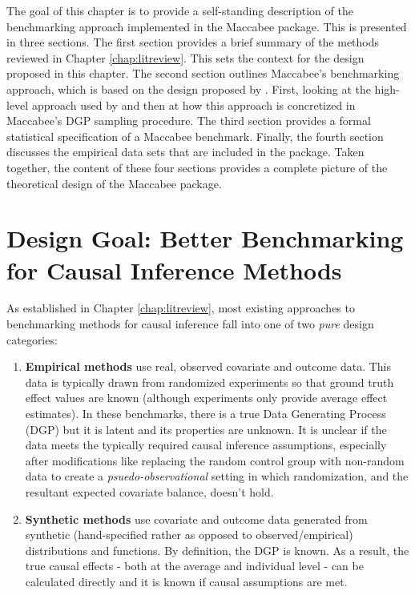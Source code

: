 \documentclass[../main.tex]{subfiles}
\begin{document}
The goal of this chapter is to provide a self-standing description of the benchmarking approach implemented in the Maccabee package. This is presented in three sections. The first section provides a brief summary of the methods reviewed in Chapter \ref{chap:litreview}. This sets the context for the design proposed in this chapter. The second section outlines Maccabee's benchmarking approach, which is based on the design proposed by \textcite{Dorie2019Automated1}. First, looking at the high-level approach used by \textcite{Dorie2019Automated1} and then at how this approach is concretized in Maccabee's DGP sampling procedure. The third section provides a formal statistical specification of a Maccabee benchmark. Finally, the fourth section discusses the empirical data sets that are included in the package. Taken together, the content of these four sections provides a complete picture of the theoretical design of the Maccabee package.

\section{Design Goal: Better Benchmarking for Causal Inference Methods}
\label{mac:problems}

As established in Chapter \ref{chap:litreview}, most existing approaches to benchmarking methods for causal inference fall into one of two \textit{pure} design categories:

\begin{enumerate}
    \item \textbf{Empirical methods} use real, observed covariate and outcome data. This data is typically drawn from randomized experiments so that ground truth effect values are known (although experiments only provide average effect estimates). In these benchmarks, there is a true Data Generating Process (DGP) but it is latent and its properties are unknown. It is unclear if the data meets the typically required causal inference assumptions, especially after modifications like replacing the random control group with non-random data to create a \textit{psuedo-observational} setting in which randomization, and the resultant expected covariate balance, doesn't hold.

    \item \textbf{Synthetic methods} use covariate and outcome data generated from synthetic (hand-specified rather as opposed to observed/empirical) distributions and functions. By definition, the DGP is known. As a result, the true causal effects - both at the average and individual level - can be calculated directly and it is known if causal assumptions are met.
\end{enumerate}
\end{document}
